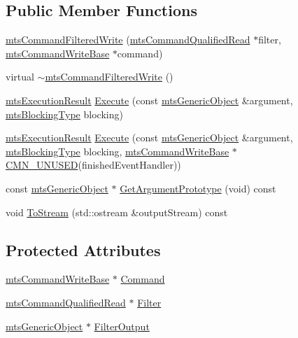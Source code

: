\subsection*{Public Member Functions}
\begin{DoxyCompactItemize}
\item 
\hyperlink{classmts_command_filtered_write_a36beea3289b7379db2819fb5aea65b9a}{mts\-Command\-Filtered\-Write} (\hyperlink{classmts_command_qualified_read}{mts\-Command\-Qualified\-Read} $\ast$filter, \hyperlink{classmts_command_write_base}{mts\-Command\-Write\-Base} $\ast$command)
\item 
virtual \hyperlink{classmts_command_filtered_write_ae133dcf12e2d87d66149ed366ea0127c}{$\sim$mts\-Command\-Filtered\-Write} ()
\item 
\hyperlink{classmts_execution_result}{mts\-Execution\-Result} \hyperlink{classmts_command_filtered_write_a6324b444c5b118399e3c4b1b3c3cc8dd}{Execute} (const \hyperlink{classmts_generic_object}{mts\-Generic\-Object} \&argument, \hyperlink{mts_forward_declarations_8h_ad7426ccb6c883bc780d0ee197dddcbe7}{mts\-Blocking\-Type} blocking)
\item 
\hyperlink{classmts_execution_result}{mts\-Execution\-Result} \hyperlink{classmts_command_filtered_write_adad546b19cb146481df6f46aef804478}{Execute} (const \hyperlink{classmts_generic_object}{mts\-Generic\-Object} \&argument, \hyperlink{mts_forward_declarations_8h_ad7426ccb6c883bc780d0ee197dddcbe7}{mts\-Blocking\-Type} blocking, \hyperlink{classmts_command_write_base}{mts\-Command\-Write\-Base} $\ast$\hyperlink{cmn_portability_8h_a021894e2626935fa2305434b1e893ff6}{C\-M\-N\-\_\-\-U\-N\-U\-S\-E\-D}(finished\-Event\-Handler))
\item 
const \hyperlink{classmts_generic_object}{mts\-Generic\-Object} $\ast$ \hyperlink{classmts_command_filtered_write_a5bd6b23d95778ef83e4ae4cc0df857fa}{Get\-Argument\-Prototype} (void) const 
\item 
void \hyperlink{classmts_command_filtered_write_a286a6a1e8963a593db2a984914faa1f7}{To\-Stream} (std\-::ostream \&output\-Stream) const 
\end{DoxyCompactItemize}
\subsection*{Protected Attributes}
\begin{DoxyCompactItemize}
\item 
\hyperlink{classmts_command_write_base}{mts\-Command\-Write\-Base} $\ast$ \hyperlink{classmts_command_filtered_write_a58cf3073e6fbdf0874d8aa369d3500cd}{Command}
\item 
\hyperlink{classmts_command_qualified_read}{mts\-Command\-Qualified\-Read} $\ast$ \hyperlink{classmts_command_filtered_write_afbf763a5226ddc747f8dd25219b2e027}{Filter}
\item 
\hyperlink{classmts_generic_object}{mts\-Generic\-Object} $\ast$ \hyperlink{classmts_command_filtered_write_a87da9e319a6eb2fe6f4ca23efbf59bce}{Filter\-Output}
\end{DoxyCompactItemize}
